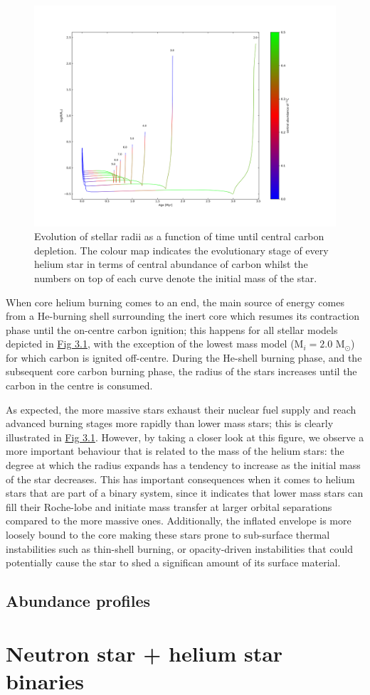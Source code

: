 \documentclass[../../main/thesis_msc.tex]{subfiles}
\begin{document}
					\begin{figure}[h]
						\centering
						\includegraphics[scale=0.4]{../figures/chapter3/radius_evolution_gradient.png}
						\caption{Evolution of stellar radii as a function of time until central carbon depletion. The colour map indicates the evolutionary stage of every helium star in terms of central abundance of carbon whilst the numbers on top of each curve denote the initial mass of the star.}
						\label{fig:radii_singles}
					\end{figure}
					
					When core helium burning comes to an end, the main source of energy comes from a He-burning shell surrounding the inert core which resumes its contraction phase until the on-centre carbon ignition; this happens for all stellar models depicted in \hyperref[fig:radii_singles]{Fig 3.1}, with the exception of the lowest mass model (M$_{i} = 2.0$ M$_{\odot}$) for which carbon is ignited off-centre. During the He-shell burning phase, and the subsequent core carbon burning phase, the radius of the stars increases until the carbon in the centre is consumed.
					
					As expected, the more massive stars exhaust their nuclear fuel supply and reach advanced burning stages more rapidly than lower mass stars; this is clearly illustrated in \hyperref[fig:radii_singles]{Fig 3.1}. However, by taking a closer look at this figure, we observe a more important behaviour that is related to the mass of the helium stars: the degree at which the radius expands has a tendency to increase as the initial mass of the star decreases. This has important consequences when it comes to helium stars that are part of a binary system, since it indicates that lower mass stars can fill their Roche-lobe and initiate mass transfer at larger orbital separations compared to the more massive ones. Additionally, the inflated envelope is more loosely bound to the core making these stars prone to sub-surface thermal instabilities such as thin-shell burning, or opacity-driven instabilities that could potentially cause the star to shed a significan amount of its surface material. %
				
				
				\subsection{Abundance profiles}	
			
			
			
			\section{Neutron star + helium star binaries}
\end{document}
